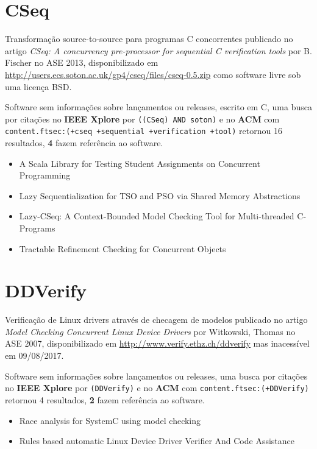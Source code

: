\section{CSeq}

Transformação source-to-source para programas C concorrentes
publicado no artigo {\it CSeq: A concurrency pre-processor for sequential C verification tools}
por B. Fischer
no ASE 2013,
disponibilizado em \url{http://users.ecs.soton.ac.uk/gp4/cseq/files/cseq-0.5.zip}
como software livre
sob uma licença BSD.

Software sem informações sobre lançamentos ou releases,
escrito em C,
uma busca por citações no {\bf IEEE Xplore} por
\texttt{((CSeq) AND soton)}
e no {\bf ACM} com
\texttt{content.ftsec:(+cseq +sequential +verification +tool)}
retornou
16 resultados,
{\bf 4} fazem referência ao software.

\begin{itemize}
\item A Scala Library for Testing Student Assignments on Concurrent Programming
\item Lazy Sequentialization for TSO and PSO via Shared Memory Abstractions
\item Lazy-CSeq: A Context-Bounded Model Checking Tool for Multi-threaded C-Programs
\item Tractable Refinement Checking for Concurrent Objects
\end{itemize}


\section{DDVerify}

Verificação de Linux drivers através de checagem de modelos
publicado no artigo {\it Model Checking Concurrent Linux Device Drivers}
por Witkowski, Thomas
no ASE 2007,
disponibilizado em \url{http://www.verify.ethz.ch/ddverify}
mas inacessível em 09/08/2017.

Software sem informações sobre lançamentos ou releases,
uma busca por citações no {\bf IEEE Xplore} por
\texttt{(DDVerify)}
e no {\bf ACM} com
\texttt{content.ftsec:(+DDVerify)}
retornou
4 resultados,
{\bf 2} fazem referência ao software.

\begin{itemize}
\item Race analysis for SystemC using model checking
\item Rules based automatic Linux Device Driver Verifier And Code Assistance
\end{itemize}


